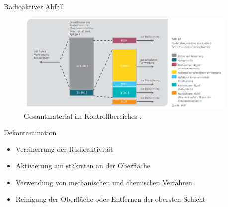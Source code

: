 \begin{frame}{Radioaktiver Abfall}
  \begin{figure}
     \centering
     \includegraphics[width=0.95\textwidth]{./bilder/radioakives_material.PNG}
     \caption{Gesamtmaterial im Kontrollbereiches \cite{muell}. }
     \label{ fig: muell_kontrollbereich}
   \end{figure}
\end{frame}



\begin{frame}{Dekontamination}
  \begin{itemize}
    \setlength\itemsep{1.2em}
    \item{ Verrinerrung der Radioaktivität}
    \item{ Aktivierung am stäkrsten an der Oberfläche}
    \item{ Verwendung von mechanischen und chemischen Verfahren}
    \item { Reinigung der Oberfläche oder Entfernen der obersten Schicht}
  \end{itemize}
\end{frame}

